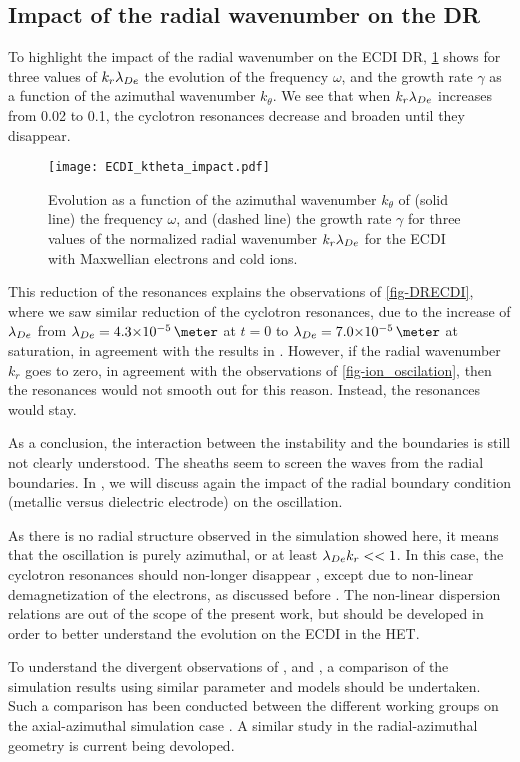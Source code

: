   \subsection{Impact of the radial wavenumber on the \acs{DR}}
   \label{subsec-kr}

  To highlight the impact of the radial wavenumber on the \ac{ECDI} \ac{DR}, \cref{fig-kreffect} shows for three values of $k_r \lambda_{De}$ the evolution of the frequency $\omega$, and  the growth rate $\gamma$ as a function of the azimuthal wavenumber $k_{\theta}$.
  We see that when $k_r \lambda_{De}$ increases from 0.02 to 0.1, the cyclotron resonances decrease and broaden until they disappear.
  \begin{figure}[!hbt]
    \centering
    \texttt{[image: ECDI\_ktheta\_impact.pdf]}
    \caption{Evolution as a function of the azimuthal wavenumber $k_{\theta}$ of (solid line) the frequency $\omega$, and (dashed line) the growth rate $\gamma$ for three values of the normalized radial wavenumber $k_r \lambda_{De}$ for the \acs{ECDI} with Maxwellian electrons and cold ions. }
    \label{fig-kreffect}
  \end{figure}
  
  This reduction of the resonances explains the observations of \cref{fig-DRECDI}, where we saw similar reduction of the cyclotron resonances, due to the increase of $\lambda_{De}$ from $\lde=\sn{4.3}{-5}\,\meter$ at $t=0$ to $\lde=\sn{7.0}{-5}\,\meter$ at saturation, in agreement with the results in \citet{lafleur2016a}.
  However, if the radial wavenumber $k_r$ goes to zero, in agreement with the observations of \cref{fig-ion_oscilation}, then the resonances would not smooth out for this reason.
  Instead, the resonances would stay.
  
  \vspace{1em}
  As a conclusion, the interaction between the instability and the boundaries is still not clearly understood.
  The sheaths seem to  screen the waves from the radial boundaries.
  In , we will discuss again the impact of the radial boundary condition (metallic versus dielectric electrode) on the oscillation.

  As there is no radial structure observed in the simulation showed here, it means that the oscillation is purely azimuthal, or at least $\lambda_{De} k_r <<1$.
  In this case, the cyclotron resonances should non-longer disappear \citep{ducrocq2006}, except due to non-linear demagnetization of the electrons, as discussed before \citep{boeuf2018,taccogna2019}.
  The non-linear dispersion relations are out of the scope of the present work, but should be developed in order to better understand the evolution on the \ac{ECDI} in the \ac{HET}.
  
  To understand the divergent observations of \citet{hara2019a,janhunen2018}, and \citet{taccogna2019}, a comparison of the simulation results using similar parameter and models should be undertaken.
  Such a comparison has been conducted between the different working groups on the axial-azimuthal simulation case \citep{charoy2019}.
  A similar study in the radial-azimuthal geometry is current being devoloped.
  
  
  
  